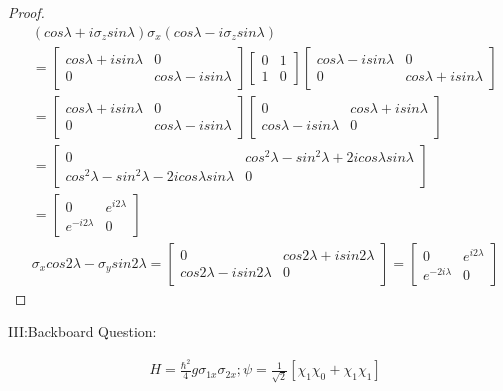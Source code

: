 \documentclass{article}
\begin{document}
\begin{proof}
  \begin{align*}
&(cos\lambda+i\sigma_zsin\lambda)\sigma_x(cos\lambda-i\sigma_zsin\lambda)\\
&=\begin{bmatrix}cos\lambda+isin\lambda&0\\0&cos\lambda-isin\lambda\end{bmatrix}\begin{bmatrix}0&1\\1&0\end{bmatrix}\begin{bmatrix}cos\lambda-isin\lambda&0\\0&cos\lambda+isin\lambda\end{bmatrix}\\
&=\begin{bmatrix}cos\lambda+isin\lambda&0\\0&cos\lambda-isin\lambda\end{bmatrix}\begin{bmatrix}0&cos\lambda+isin\lambda\\cos\lambda-isin\lambda&0\end{bmatrix}\\
&=\begin{bmatrix}0&cos^2\lambda-sin^2\lambda+2icos\lambda sin\lambda\\cos^2\lambda-sin^2\lambda-2icos\lambda sin\lambda&0\end{bmatrix}\\
&=\begin{bmatrix}0&e^{i2\lambda}\\e^{-i2\lambda}&0\end{bmatrix}\\
&\sigma_xcos2\lambda-\sigma_ysin2\lambda=\begin{bmatrix}0&cos2\lambda+isin2\lambda\\cos2\lambda-isin2\lambda&0\end{bmatrix}=\begin{bmatrix}0&e^{i2\lambda}\\e^{-2i\lambda}&0\end{bmatrix}
  \end{align*}
\end{proof}

III:Backboard Question:

\begin{align*}
&H=\frac{\hbar^2}4g\sigma_{1x}\sigma_{2x};\psi=\frac1{\sqrt{2}}[\chi_1\chi_0+\chi_1\chi_1]
\end{align*}
\end{document}
